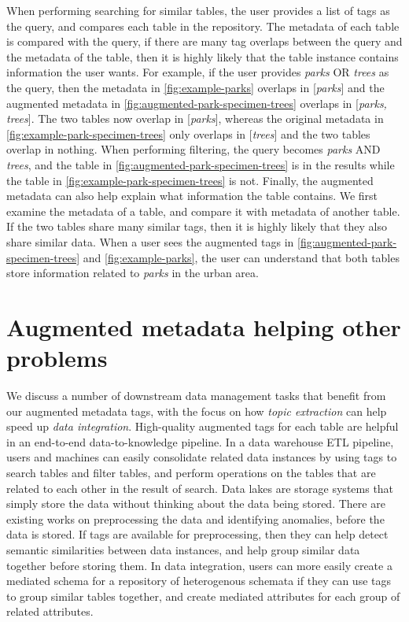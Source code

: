 When performing searching for similar tables, the user provides a list of tags as the query, and compares each table in the repository. The metadata of each table is compared with the query, if there are many tag overlaps between the query and the metadata of the table, then it is highly likely that the table instance contains information the user wants. For example, if the user provides \textit{parks} OR \textit{trees} as the query, then the metadata in \autoref{fig:example-parks} overlaps in [\textit{parks}] and the augmented metadata in \autoref{fig:augmented-park-specimen-trees} overlaps in [\textit{parks, trees}]. The two tables now overlap in [\textit{parks}], whereas the original metadata in \autoref{fig:example-park-specimen-trees} only overlaps in [\textit{trees}] and the two tables overlap in nothing. When performing filtering, the query becomes \textit{parks} AND \textit{trees}, and the table in \autoref{fig:augmented-park-specimen-trees} is in the results while the table in \autoref{fig:example-park-specimen-trees} is not. Finally, the augmented metadata can also help explain what information the table contains. We first examine the metadata of a table, and compare it with metadata of another table. If the two tables share many similar tags, then it is highly likely that they also share similar data. When a user sees the augmented tags in \autoref{fig:augmented-park-specimen-trees} and \autoref{fig:example-parks}, the user can understand that both tables store information related to \textit{parks} in the urban area.

\section{Augmented metadata helping other problems}
\label{sec:AugmentedMetadataHelpingOtherProblems}

We discuss a number of downstream data management tasks that benefit from our augmented metadata tags, with the focus on how \textit{topic extraction} can help speed up \textit{data integration}. High-quality augmented tags for each table are helpful in an end-to-end data-to-knowledge pipeline. In a data warehouse ETL pipeline, users and machines can easily consolidate related data instances by using tags to search tables and filter tables, and perform operations on the tables that are related to each other in the result of search. Data lakes are storage systems that simply store the data without thinking about the data being stored. There are existing works on preprocessing the data and identifying anomalies, before the data is stored. If tags are available for preprocessing, then they can help detect semantic similarities between data instances, and help group similar data together before storing them. In data integration, users can more easily create a mediated schema for a repository of heterogenous schemata if they can use tags to group similar tables together, and create mediated attributes for each group of related attributes.

